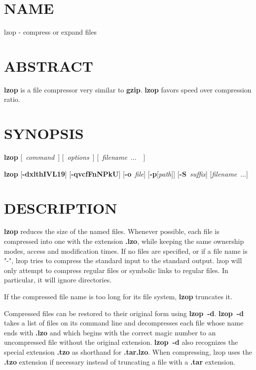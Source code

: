 \section{NAME\label{NAME}}


lzop - compress or expand files

\section{ABSTRACT\label{ABSTRACT}}


\textbf{lzop} is a file compressor very similar to \textbf{gzip}.
\textbf{lzop} favors speed over compression ratio.

\section{SYNOPSIS\label{SYNOPSIS}}


\textbf{lzop} [~\textit{command}~] [~\textit{options}~] [~\textit{filename}~...~~]



\textbf{lzop} [\textbf{-dxlthIVL19}] [\textbf{-qvcfFnNPkU}]
[\textbf{-o}~\textit{file}] [\textbf{-p}[\textit{path}]] [\textbf{-S}~\textit{suffix}]
[\textit{filename}~...]

\section{DESCRIPTION\label{DESCRIPTION}}


\textbf{lzop} reduces the size of the named files. Whenever possible,
each file is compressed into one with the extension
\textbf{.lzo}, while keeping the same ownership modes, access and
modification times. If no files are specified, or if a
file name is "-", lzop tries to compress the standard
input to the standard output. lzop will only attempt to
compress regular files or symbolic links to regular files.
In particular, it will ignore directories.



If the compressed file name is too long for its file system,
\textbf{lzop} truncates it.



Compressed files can be restored to their original form
using \textbf{lzop~-d}.
\textbf{lzop~-d} takes a list of files on its command line and
decompresses each file whose name ends with \textbf{.lzo} and which
begins with the correct magic number to an uncompressed
file without the original extension. \textbf{lzop~-d} also recognizes
the special extension \textbf{.tzo} as shorthand for \textbf{.tar.lzo}.
When compressing, lzop uses the \textbf{.tzo} extension if necessary
instead of truncating a file with a \textbf{.tar} extension.



